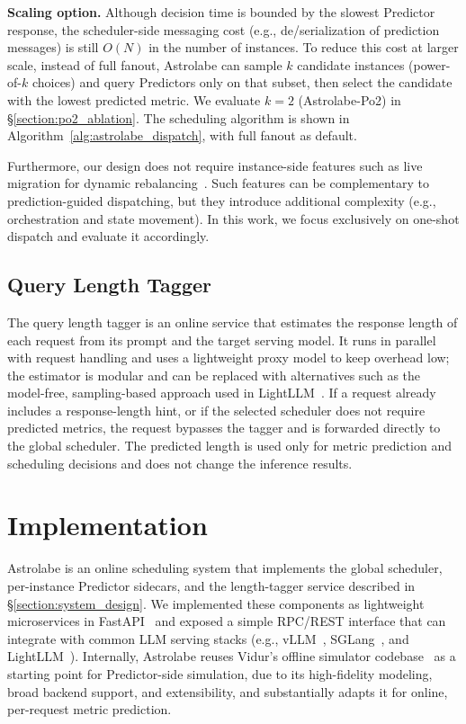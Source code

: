 \documentclass[sigconf, review, anonymous]{acmart}
\begin{document}
\textbf{Scaling option.} Although decision time is bounded by the slowest Predictor response, the scheduler-side messaging cost (e.g., de/serialization of prediction messages) is still $O(N)$ in the number of instances. To reduce this cost at larger scale, instead of full fanout, Astrolabe can sample $k$ candidate instances (power-of-$k$ choices) and query Predictors only on that subset, then select the candidate with the lowest predicted metric. We evaluate $k=2$ (Astrolabe-Po2) in \S\ref{section:po2_ablation}. The scheduling algorithm is shown in Algorithm~\ref{alg:astrolabe_dispatch}, with full fanout as default.

Furthermore, our design does not require instance-side features such as live migration for dynamic rebalancing~\cite{sun2024llumnix}. Such features can be complementary to prediction-guided dispatching, but they introduce additional complexity (e.g., orchestration and state movement). In this work, we focus exclusively on one-shot dispatch and evaluate it accordingly.

\subsection{Query Length Tagger}\label{section:query_tagger}
The query length tagger is an online service that estimates the response length of each request from its prompt and the target serving model. It runs in parallel with request handling and uses a lightweight proxy model to keep overhead low; the estimator is modular and can be replaced with alternatives such as the model-free, sampling-based approach used in LightLLM~\cite{lightLLM}. If a request already includes a response-length hint, or if the selected scheduler does not require predicted metrics, the request bypasses the tagger and is forwarded directly to the global scheduler. The predicted length is used only for metric prediction and scheduling decisions and does not change the inference results.

\section{Implementation} \label{section:implementation} 
 

Astrolabe is an online scheduling system that implements the global scheduler, per-instance Predictor sidecars, and the length-tagger service described in \S\ref{section:system_design}. We implemented these components as lightweight microservices in FastAPI~\cite{tiangoloServerWorkers} and exposed a simple RPC/REST interface that can integrate with common LLM serving stacks (e.g., vLLM~\cite{vllm}, SGLang~\cite{sglang}, and LightLLM~\cite{lightLLM}). Internally, Astrolabe reuses Vidur's offline simulator codebase~\cite{vidur} as a starting point for Predictor-side simulation, due to its high-fidelity modeling, broad backend support, and extensibility, and substantially adapts it for online, per-request metric prediction.
\end{document}
